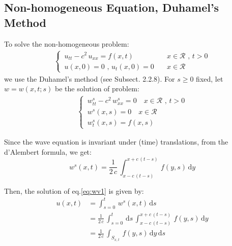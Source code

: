 \documentclass[../main.tex]{subfiles}
\begin{document}
\subsection{Non-homogeneous Equation, Duhamel's Method}

To solve the non-homogeneous problem:
\begin{align}
    \begin{cases} \label{eq:wv1}
        \, u_{tt} - c^2 \, u_{xx} = f(x,t) \quad & x \in \mathcal{R} \text{ ,  } t > 0 \\
        \, u(x,0) = 0 \text{ ,  } u_t(x,0) = 0 \quad & x \in \mathcal{R}
    \end{cases}
\end{align}
we use the Duhamel's method (see Subsect. 2.2.8). For $s \geqslant 0$ fixed, let $w = w (x,t;s)$ be the solution of problem:
\begin{align}
    \begin{cases} \label{eq:wv2}
        \, w_{tt}^s - c^2 \, w_{xx}^s = 0 \quad x \in \mathcal{R} \text{ ,  } t > 0 \\
        \, w^s(x,s) = 0 \quad x \in \mathcal{R} \\
        \, w_t^s(x,s) = f(x,s)
    \end{cases}
\end{align}

Since the wave equation is invariant under (time) translations, from the d'Alembert formula, we get:
\begin{equation} \label{eq:wv3}
    w^s(x,t) = \frac{1}{2 \, c} \, \int_{x - c \, (t - s)}^{x + c \, (t - s)} \, f(y,s) \, \mathrm{d} y
\end{equation}

Then, the solution of eq.\ref{eq:wv1} is given by:
\begin{align}
    u(x,t) &= \int_{s = 0}^t \, w^s(x,t) \, \mathrm{d} s \\
    &= \frac{1}{2 \, c} \, \int_{s = 0}^t \, \mathrm{d} s \, \int_{x - c \, (t - s)}^{x + c \, (t - s)} \, f(y,s) \, \mathrm{d} y \\
    &= \frac{1}{2 \, c} \, \int_{S_{x,t}} \, f(y,s) \, \mathrm{d} y \, \mathrm{d} s
\end{align}
\end{document}
